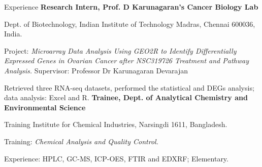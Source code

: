 \begin{rubric}{Experience}
    \entry*[2020]%
        \textbf{Research Intern, Prof. D Karunagaran's Cancer Biology Lab}\par Dept. of Biotechnology, Indian Institute of Technology Madras, Chennai 600036, India.\par
        Project: \emph{Microarray Data Analysis Using GEO2R to Identify Differentially Expressed Genes in Ovarian Cancer after NSC319726 Treatment and Pathway Analysis.} Supervisor: Professor Dr Karunagaran Devarajan \par 
        Retrieved three RNA-seq datasets, performed the statistical and DEGs analysis; data analysis: Excel and R.
    \entry*[2019]%
        \textbf{Trainee, Dept. of Analytical Chemistry and Environmental Science} \par
        Training Institute for Chemical Industries, Narsingdi 1611, Bangladesh.\par
        Training: \emph{Chemical Analysis and Quality Control.} \par 
        Experience: HPLC, GC-MS, ICP-OES, FTIR and EDXRF; Elementary.
    \end{rubric}